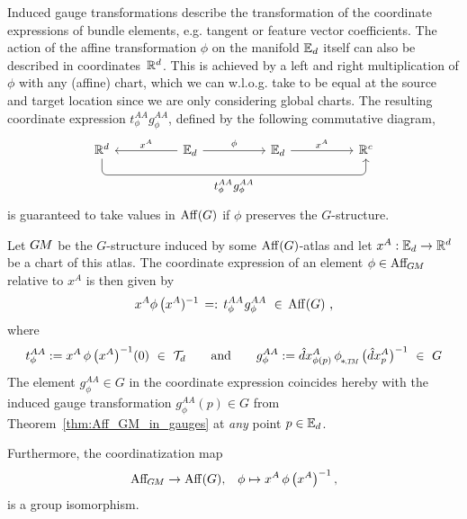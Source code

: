 Induced gauge transformations describe the transformation of the coordinate expressions of bundle elements, e.g. tangent or feature vector coefficients.
The action of the affine transformation $\phi$ on the manifold $\mathbb{E}_d$ itself can also be described in coordinates~$\mathbb{R}^d$.
This is achieved by a left and right multiplication of $\phi$ with any (affine) chart, which we can w.l.o.g. take to be equal at the source and target location since we are only considering global charts.
The resulting coordinate expression $t_\phi^{AA} g_\phi^{AA}$, defined by the following commutative diagram,
\begin{equation}\label{cd:AffGM_in_chart}
    \begin{tikzcd}[row sep=2.5em, column sep=5em]
        \R^d
            \arrow[rrr, rounded corners, to path={ 
                    |- node[below, pos=.75]{\small$t_\phi^{AA} \mkern1mu g_\phi^{AA}$} ([yshift=-3.ex, xshift=0ex]\tikztotarget.south)
                    -- ([xshift=0ex]\tikztotarget.south)
                    }]
        &
        \Euc_d
            \arrow[l, "x^A"']
            \arrow[r, "\phi"]
        &
        \Euc_d
            \arrow[r, "x^A"]
        &
        \R^c
    \end{tikzcd}
\end{equation}
is guaranteed to take values in $\operatorname{Aff}(G)$ if $\phi$ preserves the $G$-structure.
\begin{thm}
\label{thm:Aff_GM_in_charts}
    Let $G\mkern-1.4muM$ be the $G$-structure induced by some $\operatorname{Aff}(G)$-atlas and let $x^A: \mathbb{E}_d \to \mathbb{R}^d$ be a chart of this atlas.
    The coordinate expression of an element $\phi \in \operatorname{Aff}_{\mkern-2muG\mkern-1.4muM}$ relative to $x^A$ is then given by
    \begin{align}\label{eq:AffGM_in_charts_eq}
        x^A \phi\, \big(x^A)^{-1} \,=:\, t_\phi^{AA} \mkern1mu g_\phi^{AA} \ \in\, \operatorname{Aff}(G) \ ,
    \end{align}
    where
    \begin{align}
        t_\phi^{AA} := x^A \,\phi\, \big(x^A \big)^{-1} (0) \ \in\ \Trans_d
        \qquad \textup{and} \qquad
        g_\phi^{AA} := 
        \hat{d}x^A_{\phi(p)} \,\dphiTM\, \big(\hat{d}x^A_p \big)^{-1} \ \in\ G
    \end{align}
    The element $g_\phi^{AA} \in G$ in the coordinate expression coincides hereby with the induced gauge transformation $g_\phi^{AA}(p) \in G$ from Theorem~\ref{thm:Aff_GM_in_gauges} at \emph{any} point $p \in \mathbb{E}_d$.

    Furthermore, the coordinatization map
    \begin{align}
        \operatorname{Aff}_{\mkern-2muG\mkern-1.4muM} \to \operatorname{Aff}(G),\,\ \ \phi \mapsto x^A \,\phi\, \big(x^A \big)^{-1} \,,
    \end{align}
    is a group isomorphism.
\end{thm}
